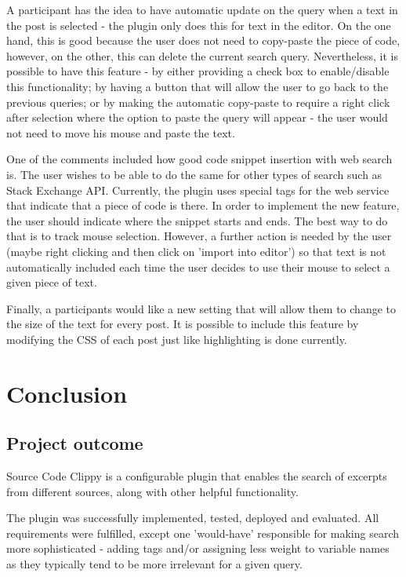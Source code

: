 \documentclass{l4proj}
\begin{document}
\begin{itemize}
A participant has the idea to have automatic update on the query when a text in the post is selected - the plugin only does this for text in the editor. On the one hand, this is good because the user does not need to copy-paste the piece of code, however, on the other, this can delete the current search query. Nevertheless, it is possible to have this feature - by either providing a check box to enable/disable this functionality; by having a button that will allow the user to go back to the previous queries; or by making the automatic copy-paste to require a right click after selection where the option to paste the query will appear - the user would not need to move his mouse and paste the text.

One of the comments included how good code snippet insertion with web search is. The user wishes to be able to do the same for other types of search such as Stack Exchange API. Currently, the plugin uses special tags for the web service that indicate that a piece of code is there. In order to implement the new feature, the user should indicate where the snippet starts and ends. The best way to do that is to track mouse selection. However, a further action is needed by the user (maybe right clicking and then click on 'import into editor') so that text is not automatically included each time the user decides to use their mouse to select a given piece of text. 

Finally, a participants would like a new setting that will allow them to change to the size of the text for every post. It is possible to include this feature by modifying the CSS of each post just like highlighting is done currently.

\end{itemize}




\chapter{Conclusion}

\section{Project outcome}

Source Code Clippy is a configurable plugin that enables the search of excerpts from different sources, along with other helpful functionality.

The plugin was successfully implemented, tested, deployed and evaluated. All requirements were fulfilled, except one 'would-have' responsible for making search more sophisticated - adding tags and/or assigning less weight to variable names as they typically tend to be more irrelevant for a given query.
\end{document}
